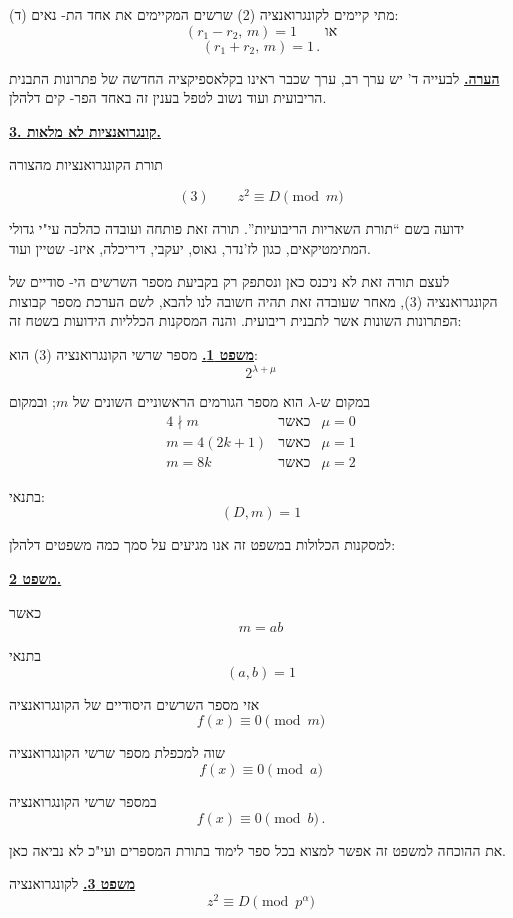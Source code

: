\noindent (ד) מתי קיימים לקונגרואנציה (2) שרשים המקיימים את אחד הת-
נאים:
\[ (r_1 - r_2,\, m) = 1 \qquad \text{או} \]
\[ (r_1 + r_2,\, m) = 1 \, . \]

\noindent\textbf{\underline{הערה.}} לבעייה ד' יש ערך רב, ערך שכבר ראינו בקלאספיקציה החדשה
של פתרונות התבנית הריבועית ועוד נשוב לטפל בענין זה באחד הפר-
קים דלהלן.

\medskip
\noindent\textbf{\underline{3. קונגרואנציות לא מלאות.}}

\noindent תורת הקונגרואנציות מהצורה

\[ (3) \qquad z^2 \equiv D \pmod{m} \]

\noindent ידועה בשם ``תורת השאריות הריבועיות''. תורה זאת פותחה ועובדה כהלכה
עי"י גדולי המתימטיקאים, כגון לז'נדר, גאוס, יעקבי, דיריכלה, איזנ-
שטיין ועוד.

\noindent לעצם תורה זאת לא ניכנס כאן ונסתפק רק בקביעת מספר השרשים הי-
סודיים של הקונגרואנציה (3), מאחר שעובדה זאת תהיה חשובה לנו להבא,
לשם הערכת מספר קבוצות הפתרונות השונות אשר לתבנית ריבועית. והנה
המסקנות הכלליות הידועות בשטח זה:

\bigskip
\noindent\textbf{\underline{משפט 1.}} מספר שרשי הקונגרואנציה (3) הוא:
\[ 2^{\lambda+\mu} \]

\noindent במקום ש-$\lambda$ הוא מספר הגורמים הראשוניים השונים של $m$;
ובמקום
\[ \begin{array}{lll}
4 \nmid m & \text{כאשר} & \mu = 0 \\
m = 4(2k+1) & \text{כאשר} & \mu = 1 \\
m = 8k & \text{כאשר} & \mu = 2
\end{array} \]

\noindent בתנאי:
\[ (D, m) = 1 \]

\noindent למסקנות הכלולות במשפט זה אנו מגיעים על סמך כמה משפטים דלהלן:

\bigskip
\noindent\textbf{\underline{משפט 2.}}

\noindent כאשר
\[ m = ab \]

\noindent בתנאי
\[ (a,b) = 1 \]

\noindent אזי מספר השרשים היסודיים של הקונגרואנציה
\[ f(x) \equiv 0 \pmod{m} \]

\noindent שוה למכפלת מספר שרשי הקונגרואנציה
\[ f(x) \equiv 0 \pmod{a} \]

\noindent במספר שרשי הקונגרואנציה
\[ f(x) \equiv 0 \pmod{b} \, . \]

\noindent את ההוכחה למשפט זה אפשר למצוא בכל ספר לימוד בתורת המספרים
ועי"כ לא נביאה כאן.

\bigskip
\noindent\textbf{\underline{משפט 3.}} לקונגרואנציה
\[ z^2 \equiv D \pmod{p^{\alpha}} \]

